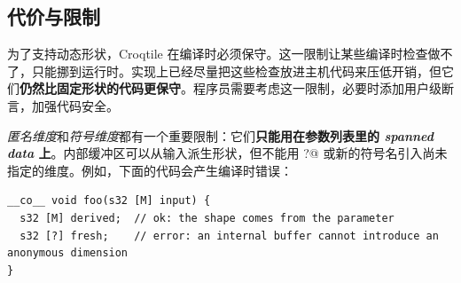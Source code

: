 \subsection*{代价与限制}

为了支持动态形状，Croqtile 在编译时必须保守。这一限制让某些编译时检查做不了，只能挪到运行时。实现上已经尽量把这些检查放进主机代码来压低开销，但它们\textbf{仍然比固定形状的代码更保守}。程序员需要考虑这一限制，必要时添加用户级断言，加强代码安全。

\emph{匿名维度}和\emph{符号维度}都有一个重要限制：它们\textbf{只能用在参数列表里的 \emph{spanned data} 上}。内部缓冲区可以从输入派生形状，但不能用 \co@?@ 或新的符号名引入尚未指定的维度。例如，下面的代码会产生编译时错误：

\begin{lstlisting}[language=croqtile,caption={代价与限制}]
__co__ void foo(s32 [M] input) {
  s32 [M] derived;  // ok: the shape comes from the parameter
  s32 [?] fresh;    // error: an internal buffer cannot introduce an anonymous dimension
}
\end{lstlisting}
